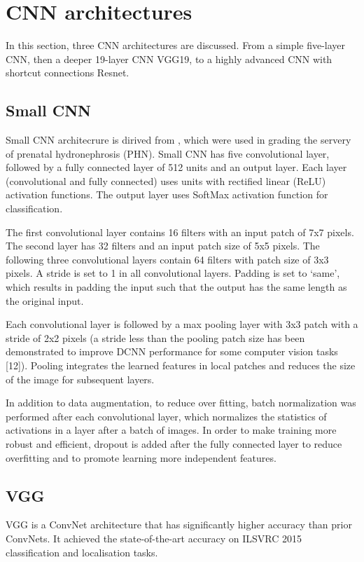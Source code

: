 \chapter{CNN architectures} 

In this section, three CNN architectures are discussed. From a simple five-layer CNN, then a deeper 19-layer CNN VGG19, to a highly advanced CNN with shortcut connections Resnet.

\section{Small CNN}
Small CNN architecrure is dirived from \cite{Dhindsa2018}, which were used in grading the servery of prenatal hydronephrosis (PHN). Small CNN has five convolutional layer, followed by a fully connected layer of 512 units and an output layer. Each layer (convolutional and fully connected) uses units with rectified linear (ReLU) activation functions. The output layer uses SoftMax activation function for classification. 

The first convolutional layer contains 16 filters with an input patch of 7x7 pixels. The second layer has 32 filters and an input patch size of 5x5 pixels. The following three convolutional layers contain 64 filters with patch size of 3x3 pixels. A stride is set to 1 in all convolutional layers. Padding is set to ‘same’, which results in padding the input such that the output has the same length as the original input.

Each convolutional layer is followed by a max pooling layer with 3x3 patch with a stride of 2x2 pixels (a stride less than the pooling patch size has been demonstrated to improve DCNN performance for some computer vision tasks [12]). Pooling integrates the learned features in local patches and reduces the size of the image for subsequent layers. 

In addition to data augmentation, to reduce over fitting, batch normalization was performed after each convolutional layer, which normalizes the statistics of activations in a layer after a batch of images. In order to make training more robust and efficient, dropout is added after the fully connected layer to reduce overfitting and to promote learning more independent features.

\section{VGG}
VGG \citep{vgg} is a ConvNet architecture that has significantly higher accuracy than prior ConvNets. It achieved the state-of-the-art accuracy on ILSVRC 2015 classification and localisation tasks. 

